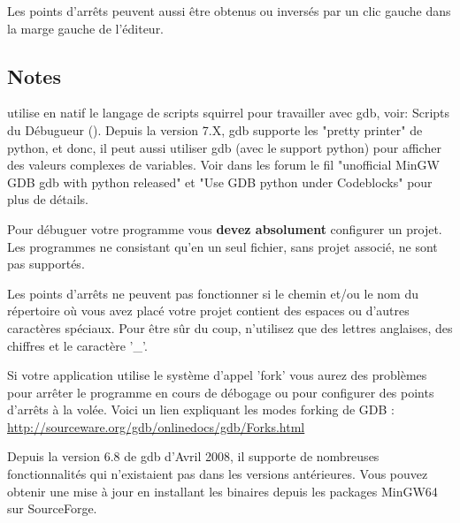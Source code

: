 Les points d'arrêts peuvent aussi être obtenus ou inversés par un clic gauche dans la marge gauche de l'éditeur. 

\subsection{Notes}

\codeblocks utilise en natif le langage de scripts squirrel pour travailler avec gdb, voir: Scripts du Débugueur (). Depuis la version 7.X, gdb supporte les "pretty printer" de python, et donc, il peut aussi utiliser gdb (avec le support python) pour afficher des valeurs complexes de variables. Voir dans les forum le fil "unofficial MinGW GDB gdb with python released" et "Use GDB python under Codeblocks" pour plus de détails.


Pour débuguer votre programme vous \textbf{devez absolument} configurer un projet. Les programmes ne consistant qu'en un seul fichier, sans projet associé, ne sont pas supportés.


Les points d'arrêts ne peuvent pas fonctionner si le chemin et/ou le nom du répertoire où vous avez placé votre projet contient des espaces ou d'autres caractères spéciaux. Pour être sûr du coup, n'utilisez que des lettres anglaises, des chiffres et le caractère '\_'.


Si votre application utilise le système d'appel 'fork' vous aurez des problèmes pour arrêter le programme en cours de débogage ou pour configurer des points d'arrêts à la volée. Voici un lien expliquant les modes forking de GDB : \url{http://sourceware.org/gdb/onlinedocs/gdb/Forks.html}


Depuis la version 6.8 de gdb d'Avril 2008, il supporte de nombreuses fonctionnalités qui n'existaient pas dans les versions antérieures. Vous pouvez obtenir une mise à jour en installant les binaires depuis les packages MinGW64 sur SourceForge.


